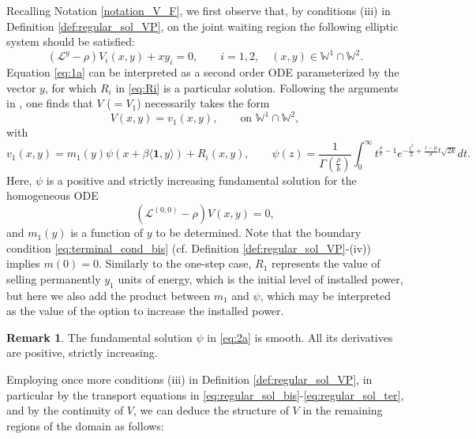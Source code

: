 \documentclass[10pt]{article}
\numberwithin{equation}{section}
\theoremstyle{plain}
\numberwithin{theorem}{section}
\theoremstyle{definition}
\newtheorem{remark}[theorem]{Remark}
\newcommand{\<}{\langle}
\renewcommand{\>}{\rangle}
\renewcommand{\(}{\left(}
\renewcommand{\)}{\right)}
\def\cL{{\mathcal L}}
\begin{document}
{{{\medskip
Recalling Notation \ref{notation_V_F}, we first observe that, by conditions (iii) in Definition \ref{def:regular_sol_VP}, on the joint waiting region %
the following elliptic system should be satisfied:
\begin{equation}\label{eq:1a}
(\cL^y-\rho)V_i(x,y)+x y_i =0,  \qquad i=1,2, \quad (x,y)\in {\mathbb{W}^1\cap\mathbb{W}^2}.
\end{equation}
Equation \eqref{eq:1a} can be interpreted as a second order ODE parameterized by the vector $y$, for which $R_i$ in \eqref{eq:Ri} is a particular solution. Following the arguments in \cite{MR4305783}, one finds that $V$ ($=V_1$) necessarily takes the form
\begin{equation}\label{eq:eq_Vv1}
V(x,y) = v_1(x,y), \qquad \text{on } {\mathbb{W}^1\cap\mathbb{W}^2},
\end{equation}
with
\begin{equation}\label{eq:2a}
{v_1(x,y)=m_1(y)\psi(x+\beta \langle \mathbf{1},y \rangle)+R_i(x,y)}, \qquad \psi(z)=\frac{1}{\Gamma(\frac \rho k)}\int_0^{\infty}t^{\frac \rho k -1}e^{-\frac{t^2}{2}+\frac{z-\mu}{\sigma}t\sqrt{2k}}dt.%
\end{equation}
Here, $\psi$ 
is a positive and strictly increasing fundamental solution for the homogeneous ODE $$(\cL^{(0,0)}-\rho)V(x,y)=0,$$
and $m_1(y)$ is a function of $y$ to be determined. Note that the boundary condition \eqref{eq:terminal_cond_bis} (cf. Definition \ref{def:regular_sol_VP}-(iv)) implies $m(0)=0$.
Similarly to the one-step case, $R_1$ represents the value of selling permanently $y_1$ units of energy, which is the initial level of installed power, but here we also add the product between $m_1$ and $\psi$, which may be interpreted as the value of the option to increase the installed power. 
\begin{remark}\label{rem:fund_sol}
The fundamental solution $\psi$ in \eqref{eq:2a} is smooth. All its derivatives are positive, strictly increasing. 
\end{remark}
Employing once more conditions (iii) in Definition \ref{def:regular_sol_VP}, in particular by the transport equations in \eqref{eq:regular_sol_bis}-\eqref{eq:regular_sol_ter}, and by the continuity of $V$, we can deduce the structure of $V$ in the remaining regions of the domain as follows:
}}}
\end{document}

